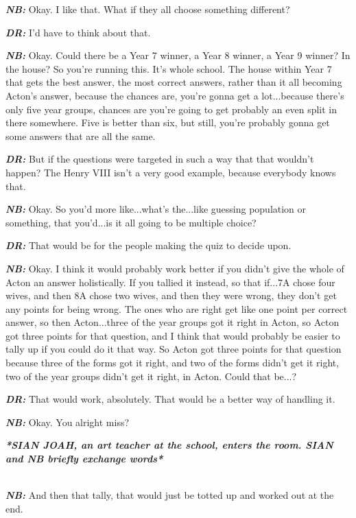 \textit{\textbf{NB:}} Okay. I like that. What if they all choose something different?

\textit{\textbf{DR:}} I'd have to think about that.

\textit{\textbf{NB:}} Okay. Could there be a Year 7 winner, a Year 8 winner, a Year 9 winner? In the house? So you're running this. It's whole school. The house within Year 7 that gets the best answer, the most correct answers, rather than it all becoming Acton's answer, because the chances are, you're gonna get a lot...because there's only five year groups, chances are you're going to get probably an even split in there somewhere. Five is better than six, but still, you're probably gonna get some answers that are all the same.

\textit{\textbf{DR:}} But if the questions were targeted in such a way that that wouldn't happen? The Henry VIII isn't a very good example, because everybody knows that.

\textit{\textbf{NB:}} Okay. So you'd more like...what's the...like guessing population or something, that you'd...is it all going to be multiple choice?

\textit{\textbf{DR:}} That would be for the people making the quiz to decide upon.

\textit{\textbf{NB:}} Okay. I think it would probably work better if you didn't give the whole of Acton an answer holistically. If you tallied it instead, so that if...7A chose four wives, and then 8A chose two wives, and then they were wrong, they don't get any points for being wrong. The ones who are right get like one point per correct answer, so then Acton...three of the year groups got it right in Acton, so Acton got three points for that question, and I think that would probably be easier to tally up if you could do it that way. So Acton got three points for that question because three of the forms got it right, and two of the forms didn't get it right, two of the year groups didn't get it right, in Acton. Could that be...?

\textit{\textbf{DR:}} That would work, absolutely. That would be a better way of handling it.

\textit{\textbf{NB:}} Okay. You alright miss?\\

\begin{center}
\textit{\textbf{*SIAN JOAH, an art teacher at the school, enters the room. SIAN and NB briefly exchange words*}}
\end{center}

\textit{\textbf{\\NB:}} And then that tally, that would just be totted up and worked out at the end.